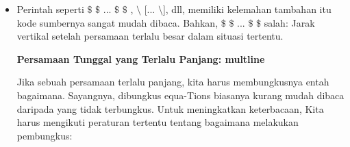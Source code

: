  \par
\noindent 
\begin{itemize}
\item Perintah seperti  $  \$  $ $  \$  $ ...  $  \$  $ $  \$  $ , $  \setminus  $ [...  $  \setminus  $], dll, memiliki kelemahan tambahan itu kode sumbernya sangat mudah dibaca. Bahkan,  $  \$  $ $  \$  $ ...  $  \$  $ $  \$  $ salah: Jarak vertikal setelah persamaan terlalu besar dalam situasi tertentu. \par
\vspace{12pt}
\noindent 
\textbf{Persamaan Tunggal yang Terlalu Panjang: multline} \par
\vspace{12pt}
\noindent 
 \hspace*{0.5in} Jika sebuah persamaan terlalu panjang, kita harus membungkusnya entah bagaimana. Sayangnya, dibungkus equa-Tions biasanya kurang mudah dibaca daripada yang tidak terbungkus. Untuk meningkatkan keterbacaan, Kita harus mengikuti peraturan tertentu tentang bagaimana melakukan pembungkus: \par
\noindent 


\end{itemize}
